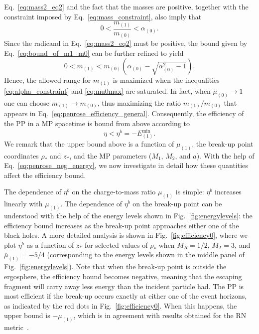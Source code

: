 Eq.~\eqref{eq:mass2_eq2} and the fact that the masses are positive, together with the constraint imposed by Eq.~\eqref{eq:mass_constraint}, also imply that
\begin{equation}\label{eq:bound_of_m1_m0}
  0 < \frac{m_{(1)}}{m_{(0)}} < \alpha_{(0)} .
\end{equation}
Since the radicand in Eq.~\eqref{eq:mass2_eq2} must be positive, the bound given by Eq.~\eqref{eq:bound_of_m1_m0} can be further refined to yield
\begin{equation} \label{eq:m1_max}
  0 < m_{(1)} < m_{(0)} \left( \alpha_{(0)} - \sqrt{\alpha_{(0)}^2 - 1} \right).
\end{equation}
Hence, the allowed range for $m_{(1)}$ is maximized when the inequalities \eqref{eq:alpha_constraint} and \eqref{eq:mu0max} are saturated. In fact, when $\mu_{(0)} \rightarrow 1$ one can choose $m_{(1)}\rightarrow m_{(0)}$, thus maximizing the ratio $m_{(1)}/m_{(0)}$ that appears in Eq.~\eqref{eq:penrose_efficiency_general}. Consequently, the efficiency of the \ac{PP} in a \ac{MP} spacetime is bound from above according to
\begin{equation} \label{eq:eta_max_theory}
  \eta < \eta ^{b}  = -E_{(1)}^{\mathrm {min}}.
\end{equation}
%
We remark that the upper bound above is a function of $\mu_{(1)}$, the break-up point coordinates $\rho_*$ and $z_*$, and the \ac{MP} parameters ($M_1$, $M_2$, and $a$). With the help of Eq.~\eqref{eq:penrose_neg_energy}, we now investigate in detail how these quantities affect the efficiency bound.

The dependence of $\eta^{b}$ on the charge-to-mass ratio $\mu_{(1)}$ is simple: $\eta^{b}$ increases linearly with $\mu_{(1)}$. The dependence of $\eta^{b}$ on the break-up point can be understood with the help of the energy levels shown in Fig.~\ref{fig:energylevels}: the efficiency bound increases as the break-up point approaches either one of the black holes. A more detailed analysis is shown in Fig.~\ref{fig:efficiency0}, where we plot $\eta^{b}$ as a function of $z_*$ for selected values of $\rho_*$ when $M_R=1/2$, $M_T=3$, and $\overline \mu_{(1)} = -5/4$ (corresponding to the energy levels shown in the middle panel of Fig.~\ref{fig:energylevels}). Note that when the break-up point is outside the ergosphere, the efficiency bound becomes negative, meaning that the escaping fragment will carry away less energy than the incident particle had. The \ac{PP} is most efficient if the break-up occurs exactly at either one of the event horizons, as indicated by the red dots in Fig.~\ref{fig:efficiency0}. When this happens, the upper bound is $-\mu_{(1)}$, which is in agreement with results obtained for the RN metric~\cite{bhat1985energetics,parthasarathy1986high}.

